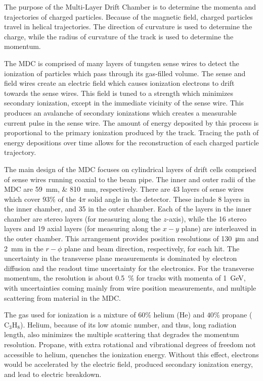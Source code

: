 The purpose of the Multi-Layer Drift Chamber is to determine the momenta and trajectories of charged particles.
Because of the magnetic field, charged particles travel in helical trajectories.
The direction of curvature is used to determine the charge, while the radius of curvature of the track is used to determine the momentum.


The MDC is comprised of many layers of tungsten sense wires to detect the ionization of particles which pass through its gas-filled volume.
The sense and field wires create an electric field which causes ionization electrons to drift towards the sense wires.
This field is tuned to a strength which minimizes secondary ionization, except in the immediate vicinity of the sense wire.
This produces an avalanche of secondary ionizations which creates a measurable current pulse in the sense wire.
The amount of energy deposited by this process is proportional to the primary ionization produced by the track.
Tracing the path of energy depositions over time allows for the reconstruction of each charged particle trajectory.


The main design of the MDC focuses on cylindrical layers of drift cells comprised of sense wires running coaxial to the beam pipe.
The inner and outer radii of the MDC are \SIlist{59;810}{\mm}, respectively.
There are 43 layers of sense wires which cover $93\%$ of the $4\pi$ solid angle in the detector.
These include 8 layers in the inner chamber, and 35 in the outer chamber.
Each of the layers in the inner chamber are stereo layers (for measuring along the $z$-axis), while the 16 stereo layers and 19 axial layers (for measuring along the $x-y$ plane) are interleaved in the outer chamber.
This arrangement provides position resolutions of \SI{130}{\um} and \SI{2}{\mm} in the $r-\phi$ plane and beam direction, respectively, for each hit.
The uncertainty in the transverse plane measurements is dominated by electron diffusion and the readout time uncertainty for the electronics.
For the transverse momentum, the resolution is about \SI{0.5}{\%} for tracks with momenta of \SI{1}{\GeV}, with uncertainties coming mainly from wire position measurements, and multiple scattering from material in the MDC.


The gas used for ionization is a mixture of $60 \%$ helium (He) and $40 \%$ propane ($\text{C}_3\text{H}_8$).
Helium, because of its low atomic number, and thus, long radiation length, also minimizes the multiple scattering that degrades the momentum resolution.
Propane, with extra rotational and vibrational degrees of freedom not accessible to helium, quenches the ionization energy.
Without this effect, electrons would be accelerated by the electric field, produced secondary ionization energy, and lead to electric breakdown.


